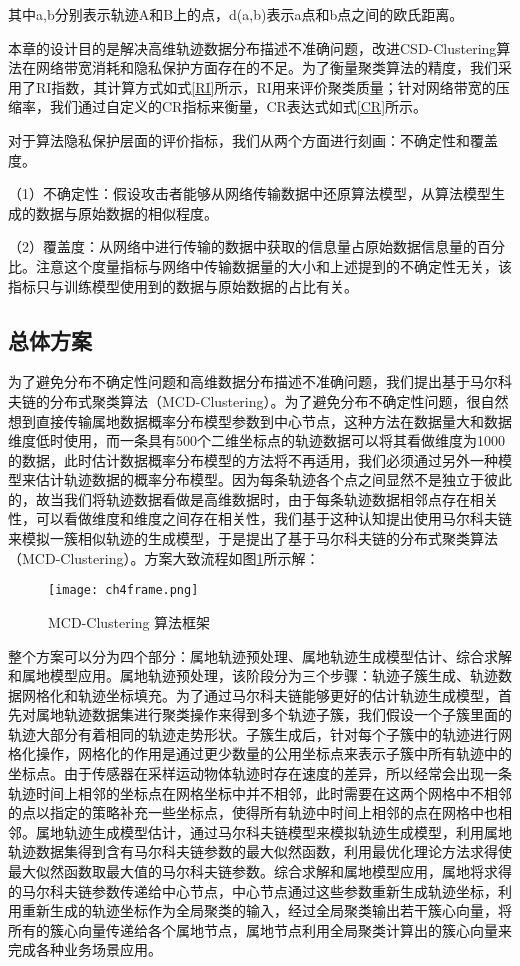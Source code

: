 其中a,b分别表示轨迹A和B上的点，d(a,b)表示a点和b点之间的欧氏距离。

本章的设计目的是解决高维轨迹数据分布描述不准确问题，改进CSD-Clustering算法在网络带宽消耗和隐私保护方面存在的不足。为了衡量聚类算法的精度，我们采用了RI指数，其计算方式如式\ref{RI}所示，RI用来评价聚类质量；针对网络带宽的压缩率，我们通过自定义的CR指标来衡量，CR表达式如式\ref{CR}所示。

对于算法隐私保护层面的评价指标，我们从两个方面进行刻画：不确定性和覆盖度。

（1）不确定性：假设攻击者能够从网络传输数据中还原算法模型，从算法模型生成的数据与原始数据的相似程度。

（2）覆盖度：从网络中进行传输的数据中获取的信息量占原始数据信息量的百分比。注意这个度量指标与网络中传输数据量的大小和上述提到的不确定性无关，该指标只与训练模型使用到的数据与原始数据的占比有关。

\subsection{总体方案}

为了避免分布不确定性问题和高维数据分布描述不准确问题，我们提出基于马尔科夫链的分布式聚类算法（MCD-Clustering）。为了避免分布不确定性问题，很自然想到直接传输属地数据概率分布模型参数到中心节点，这种方法在数据量大和数据维度低时使用，而一条具有500个二维坐标点的轨迹数据可以将其看做维度为1000的数据，此时估计数据概率分布模型的方法将不再适用，我们必须通过另外一种模型来估计轨迹数据的概率分布模型。因为每条轨迹各个点之间显然不是独立于彼此的，故当我们将轨迹数据看做是高维数据时，由于每条轨迹数据相邻点存在相关性，可以看做维度和维度之间存在相关性，我们基于这种认知提出使用马尔科夫链来模拟一簇相似轨迹的生成模型，于是提出了基于马尔科夫链的分布式聚类算法（MCD-Clustering）。方案大致流程如图\ref{ch4frame}所示解：
\begin{figure}[H]
	\texttt{[image: ch4frame.png]}
	\caption{MCD-Clustering 算法框架}
	\label{ch4frame}
\end{figure}

整个方案可以分为四个部分：属地轨迹预处理、属地轨迹生成模型估计、综合求解和属地模型应用。属地轨迹预处理，该阶段分为三个步骤：轨迹子簇生成、轨迹数据网格化和轨迹坐标填充。为了通过马尔科夫链能够更好的估计轨迹生成模型，首先对属地轨迹数据集进行聚类操作来得到多个轨迹子簇，我们假设一个子簇里面的轨迹大部分有着相同的轨迹走势形状。子簇生成后，针对每个子簇中的轨迹进行网格化操作，网格化的作用是通过更少数量的公用坐标点来表示子簇中所有轨迹中的坐标点。由于传感器在采样运动物体轨迹时存在速度的差异，所以经常会出现一条轨迹时间上相邻的坐标点在网格坐标中并不相邻，此时需要在这两个网格中不相邻的点以指定的策略补充一些坐标点，使得所有轨迹中时间上相邻的点在网格中也相邻。属地轨迹生成模型估计，通过马尔科夫链模型来模拟轨迹生成模型，利用属地轨迹数据集得到含有马尔科夫链参数的最大似然函数，利用最优化理论方法求得使最大似然函数取最大值的马尔科夫链参数。综合求解和属地模型应用，属地将求得的马尔科夫链参数传递给中心节点，中心节点通过这些参数重新生成轨迹坐标，利用重新生成的轨迹坐标作为全局聚类的输入，经过全局聚类输出若干簇心向量，将所有的簇心向量传递给各个属地节点，属地节点利用全局聚类计算出的簇心向量来完成各种业务场景应用。


